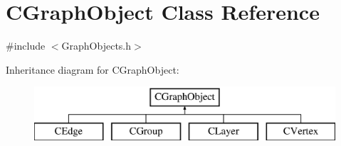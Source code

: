 \hypertarget{class_c_graph_object}{}\section{C\+Graph\+Object Class Reference}
\label{class_c_graph_object}


{\ttfamily \#include $<$Graph\+Objects.\+h$>$}

Inheritance diagram for C\+Graph\+Object\+:\begin{figure}[H]
\begin{center}
\leavevmode
\includegraphics[height=2.000000cm]{class_c_graph_object}
\end{center}
\end{figure}
